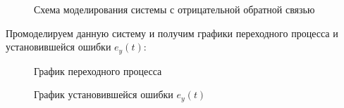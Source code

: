 \documentclass[a4paper, 11pt]{article}
\begin{document}
\begin{figure}[h!]
\caption{Схема моделирования системы с отрицательной обратной связью}
\label{ris:image}
\end{figure}

\par 
Промоделируем данную систему и получим графики переходного процесса и установившейся ошибки $e_y(t)$:

\begin{figure}[h!]
\caption{График переходного процесса }
\label{ris:image}
\end{figure}

\newpage
\begin{figure}[h!]
\caption{График установившейся ошибки $e_y(t)$}
\label{ris:image}
\end{figure}
\end{document}
